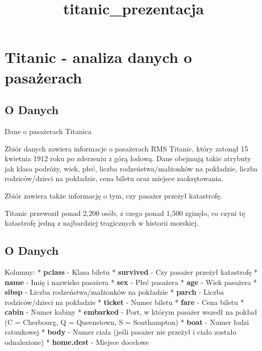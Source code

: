 \documentclass[11pt]{article}
\title{titanic\_prezentacja}
\begin{document}
    
    \maketitle
    
    

    
    \section{Titanic - analiza danych o
pasażerach}\label{titanic---analiza-danych-o-pasaux17cerach}

    \subsection{O Danych}\label{o-danych}

Dane o pasażerach Titanica

Zbiór danych zawiera informacje o pasażerach RMS Titanic, który zatonął
15 kwietnia 1912 roku po zderzeniu z górą lodową. Dane obejmują takie
atrybuty jak klasa podróży, wiek, płeć, liczba rodzeństwa/małżonków na
pokładzie, liczba rodziców/dzieci na pokładzie, cena biletu oraz miejsce
zaokrętowania.

Zbiór zawiera także informację o tym, czy pasażer przeżył katastrofę.

Titanic przewoził ponad 2,200 osób, z czego ponad 1,500 zginęło, co
czyni tę katastrofę jedną z najbardziej tragicznych w historii morskiej.

    \subsection{O Danych}\label{o-danych}

Kolumny: * \textbf{pclass} - Klasa biletu * \textbf{survived} - Czy
pasażer przeżył katastrofę * \textbf{name} - Imię i nazwisko pasażera *
\textbf{sex} - Płeć pasażera * \textbf{age} - Wiek pasażera *
\textbf{sibsp} - Liczba rodzeństwa/małżonków na pokładzie *
\textbf{parch} - Liczba rodziców/dzieci na pokładzie * \textbf{ticket} -
Numer biletu * \textbf{fare} - Cena biletu * \textbf{cabin} - Numer
kabiny * \textbf{embarked} - Port, w którym pasażer wszedł na pokład (C
= Cherbourg, Q = Queenstown, S = Southampton) * \textbf{boat} - Numer
łodzi ratunkowej * \textbf{body} - Numer ciała (jeśli pasażer nie
przeżył i ciało zostało odnalezione) * \textbf{home.dest} - Miejsce
docelowe
\end{document}
